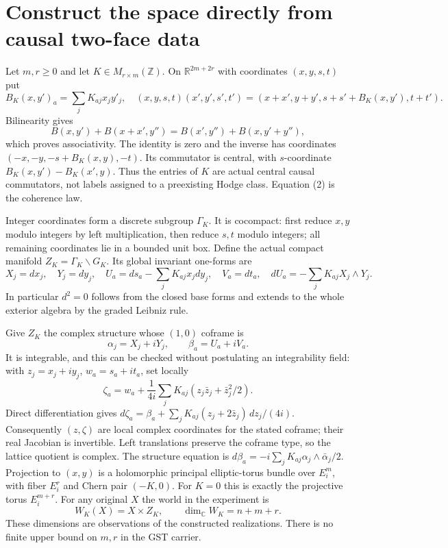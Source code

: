 \documentclass[11pt]{article}
\newcommand{\C}{\mathbb C}
\newcommand{\R}{\mathbb R}
\begin{document}
\section{Construct the space directly from causal two-face data}
Let $m,r\geq0$ and let $K\in M_{r\times m}(\mathbb Z)$.
On $\R^{2m+2r}$ with coordinates $(x,y,s,t)$ put
\[
 B_K(x,y')_a=\sum_jK_{aj}x_j y'_j,
\quad (x,y,s,t)(x',y',s',t')
 =(x+x',y+y',s+s'+B_K(x,y'),t+t').                    \tag{1}
\]
Bilinearity gives
\[
 B(x,y')+B(x+x',y'')=B(x',y'')+B(x,y'+y''),            \tag{2}
\]
which proves associativity. The identity is zero and the inverse has
coordinates $(-x,-y,-s+B_K(x,y),-t)$. Its commutator is central, with
$s$-coordinate $B_K(x,y')-B_K(x',y)$.
Thus the entries of $K$ are actual central causal commutators, not labels
assigned to a preexisting Hodge class. Equation (2) is the coherence law.

Integer coordinates form a discrete subgroup $\Gamma_K$. It is cocompact:
first reduce $x,y$ modulo integers by left multiplication, then reduce
$s,t$ modulo integers; all remaining coordinates lie in a bounded unit
box. Define the actual compact manifold $Z_K=\Gamma_K\backslash G_K$.
Its global invariant one-forms are
\[
 X_j=dx_j,\quad Y_j=dy_j,\quad
 U_a=ds_a-\sum_jK_{aj}x_jdy_j,\quad V_a=dt_a,
\quad dU_a=-\sum_jK_{aj}X_j\wedge Y_j.                \tag{3}
\]
In particular $d^2=0$ follows from the closed base forms and extends to the
whole exterior algebra by the graded Leibniz rule.

Give $Z_K$ the complex structure whose $(1,0)$ coframe is
\[
 \alpha_j=X_j+iY_j,\qquad\beta_a=U_a+iV_a.
\]
It is integrable, and this can be checked without postulating an
integrability field: with $z_j=x_j+iy_j$, $w_a=s_a+it_a$, set locally
\[
 \zeta_a=w_a+\frac1{4i}\sum_jK_{aj}
                   (z_j\bar z_j+\bar z_j^2/2).
\]
Direct differentiation gives
$d\zeta_a=\beta_a+\sum_jK_{aj}(z_j+2\bar z_j)\,dz_j/(4i)$.
Consequently $(z,\zeta)$ are local complex coordinates for the stated
coframe; their real Jacobian is invertible. Left translations preserve
the coframe type, so the lattice quotient is complex. The structure equation
is $d\beta_a=-i\sum_jK_{aj}\alpha_j\wedge\bar\alpha_j/2$.
Projection to $(x,y)$ is a holomorphic principal elliptic-torus bundle
over $E_i^m$, with fiber $E_i^r$ and Chern pair $(-K,0)$.
For $K=0$ this is exactly the projective torus $E_i^{m+r}$.
For any original $X$ the world in the experiment is
\[
 W_K(X)=X\times Z_K,\qquad \dim_\C W_K=n+m+r.         \tag{4}
\]
These dimensions are observations of the constructed realizations.
There is no finite upper bound on $m,r$ in the GST carrier.
\end{document}
